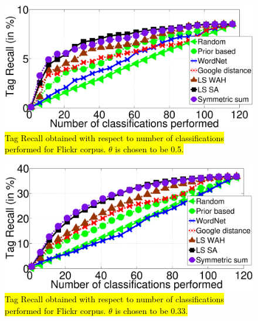 \begin{figure}[!htp]
\centering
\includegraphics[width=0.65\linewidth]{TagTree/RebuttalFlickrFastTP}
\caption{\hl{Tag Recall obtained with respect to number of classifications performed for Flickr corpus. $\theta$ is chosen to  be 0.5.} } 
\label{fig:EfficientTagPredGraphFlickr}
\end{figure}
\begin{figure}[!htp]
\centering
\includegraphics[width=0.65\linewidth]{TagTree/Rebuttal_FWS_Fast_LOWER}
\caption{\hl{Tag Recall obtained with respect to number of classifications performed for Flickr corpus. $\theta$ is chosen to be 0.33. } }
\label{fig:EfficientTagPredGraphFlickrLower}
\end{figure}
